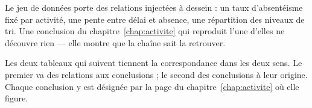 %
%
%

\label{annexe:correspondance}

Le jeu de données porte des relations injectées à dessein : un taux d'absentéisme fixé par
activité, une pente entre délai et absence, une répartition des niveaux de tri. Une conclusion du
chapitre~\ref{chap:activite} qui reproduit l'une d'elles ne découvre rien — elle montre que la
chaîne sait la retrouver.

Les deux tableaux qui suivent tiennent la correspondance dans les deux sens. Le premier va des
relations aux conclusions ; le second des conclusions à leur origine. Chaque conclusion y est
désignée par la page du chapitre~\ref{chap:activite} où elle figure.

\newcommand*{\pagesconclusions}[1]{%
  \def\separateurconclusion{\def\separateurconclusion{, }}%
  \renewcommand*{\do}[1]{\separateurconclusion p.~\pageref{conclusion:##1}}%
  \docsvlist{#1}}

